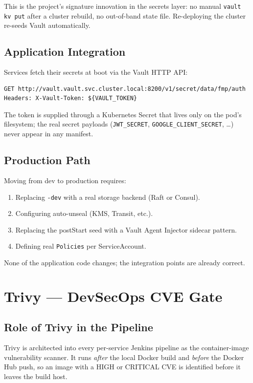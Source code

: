 \documentclass[11pt,a4paper]{article}
\begin{document}
This is the project's signature innovation in the secrets layer: no
manual \texttt{vault kv put} after a cluster rebuild, no out-of-band
state file.  Re-deploying the cluster re-seeds Vault automatically.

\subsection{Application Integration}
Services fetch their secrets at boot via the Vault HTTP API:

\begin{lstlisting}
GET http://vault.vault.svc.cluster.local:8200/v1/secret/data/fmp/auth
Headers: X-Vault-Token: ${VAULT_TOKEN}
\end{lstlisting}

The token is supplied through a Kubernetes Secret that lives only on
the pod's filesystem; the real secret payloads (\texttt{JWT\_SECRET},
\texttt{GOOGLE\_CLIENT\_SECRET}, \dots) never appear in any manifest.

\subsection{Production Path}
Moving from dev to production requires:

\begin{enumerate}[leftmargin=*]
  \item Replacing \texttt{-dev} with a real storage backend (Raft or
        Consul).
  \item Configuring auto-unseal (KMS, Transit, etc.).
  \item Replacing the postStart seed with a Vault Agent Injector
        sidecar pattern.
  \item Defining real \texttt{Policies} per ServiceAccount.
\end{enumerate}

None of the application code changes; the integration points are
already correct.

\section{Trivy — DevSecOps CVE Gate}

\subsection{Role of Trivy in the Pipeline}
Trivy is architected into every per-service Jenkins pipeline as the
container-image vulnerability scanner.  It runs \emph{after} the
local Docker build and \emph{before} the Docker Hub push, so an
image with a HIGH or CRITICAL CVE is identified before it leaves the
build host.
\end{document}
